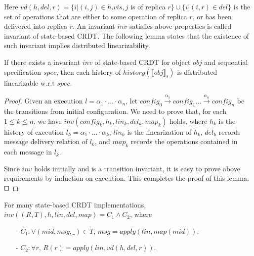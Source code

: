 Here $\mathit{vd}(h,\mathit{del},r) = \{ i \vert (i,j) \in h.\mathit{vis}, j$ is of replica $r \} \cup \{ i \vert (i,r) \in \mathit{del} \}$ is the set of operations that are either to some operation of replica $r$, or has been delivered into replica $r$. An invariant $\mathit{inv}$ satisfies above properties is called invariant of state-based CRDT. The following lemma states that the existence of such invariant implies distributed linearizability. 

\begin{lemma}
\label{lemma:invariant of state-based CRDT implies distributed linearizability}
If there exists a invariant $\mathit{inv}$ of state-based CRDT for object $\mathit{obj}$ and sequential specification $\mathit{spec}$, then each history of $\mathit{history}(\llbracket \mathit{obj} \rrbracket_s)$ is distributed linearizable w.r.t $\mathit{spec}$.
\end{lemma}

\begin {proof}
Given an execution $l=\alpha_1 \cdot \ldots \cdot \alpha_n$, let $\mathit{config}_0 {\xrightarrow{\alpha_1}} \mathit{config}_1 \ldots {\xrightarrow{\alpha_n}} \mathit{config}_n$ be the transitions from initial configuration. We need to prove that, for each $1 \leq k \leq n$, we have $\mathit{inv}(\mathit{config}_k,h_k,\mathit{lin}_k,\mathit{del}_k,\mathit{map}_k)$ holds, where $h_k$ is the history of execution $l_k = \alpha_1 \cdot \ldots \cdot \alpha_k$, $\mathit{lin}_k$ is the linearization of $h_k$, $\mathit{del}_k$ records message delivery relation of $l_k$, and $\mathit{map}_k$ records the operations contained in each message in $l_k$.

Since $\mathit{inv}$ holds initially and is a transition invariant, it is easy to prove above requirements by induction on execution. This completes the proof of this lemma. $\qed$
\end {proof}


For many state-based CRDT implementations, $\mathit{inv}((R,T),h,\mathit{lin},\mathit{del},\mathit{map}) = C_1 \wedge C_2$, where

\begin{itemize}
\setlength{\itemsep}{0.5pt}

\item[-] $C_1: \forall (\mathit{mid},\mathit{msg},\_) \in T$, $\mathit{msg} = \mathit{apply}(\mathit{lin},\mathit{map}(\mathit{mid}))$.

\item[-] $C_2: \forall r$, $R(r) = \mathit{apply}(\mathit{lin},\mathit{vd}(h,\mathit{del},r))$.
\end{itemize}

